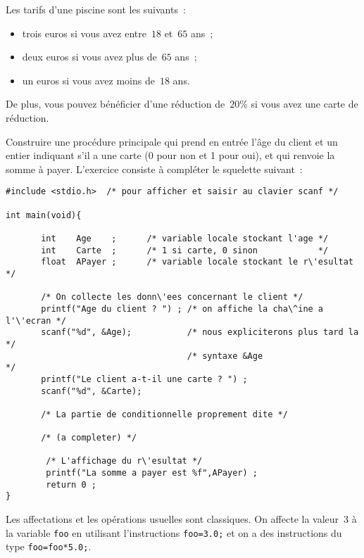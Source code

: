 \begin{exercice}
  Les tarifs d'une piscine sont les suivants~:
  \begin{itemize}
  \item trois euros si vous avez entre~$18$ et~$65$ ans~;
  \item deux euros si vous avez plus de~$65$ ans~;
  \item un euros si vous avez moins de~$18$ ans.
  \end{itemize}
  De plus, vous pouvez b\'en\'eficier  d'une r\'eduction de~$20$\%  si
  vous avez une carte de r\'eduction.
  \par\medskip\noindent
  Construire une proc\'edure principale qui  prend en entr\'ee l'\^age
  du client et un entier indiquant  s'il a une  carte (0 pour non et 1
  pour oui), et qui renvoie  la somme  \`a payer. L'exercice  consiste
  \`a compl\'eter le squelette suivant~:
\begin{verbatim}
#include <stdio.h>  /* pour afficher et saisir au clavier scanf */

int main(void){

       int    Age    ;      /* variable locale stockant l'age */
       int    Carte  ;      /* 1 si carte, 0 sinon            */
       float  APayer ;      /* variable locale stockant le r\'esultat */

       /* On collecte les donn\'ees concernant le client */
       printf("Age du client ? ") ; /* on affiche la cha\^ine a l'\'ecran */
       scanf("%d", &Age);           /* nous expliciterons plus tard la */
                                    /* syntaxe &Age                    */
       printf("Le client a-t-il une carte ? ") ;
       scanf("%d", &Carte);

       /* La partie de conditionnelle proprement dite */

       /* (a completer) */

        /* L'affichage du r\'esultat */
        printf("La somme a payer est %f",APayer) ;
        return 0 ;
}
\end{verbatim}
  Les affectations  et les op\'erations  usuelles sont classiques.  On
  affecte la  valeur~$3$  \`a la  variable  \texttt{foo}  en utilisant
  l'instructions \mbox{\texttt{foo=3.0;}} et on  a des instructions du
  type \mbox{\texttt{foo=foo*5.0;}}.
  \ifcorrection
  \begin{correction}
    
  \end{correction}
  \fi
\end{exercice}
